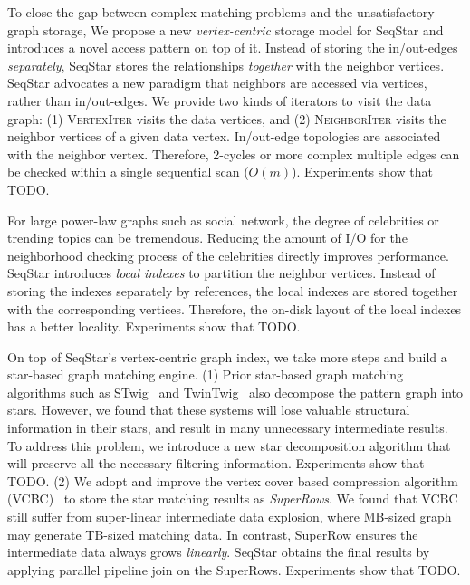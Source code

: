 To close the gap between complex matching problems and the unsatisfactory graph storage,
We propose a new \emph{vertex-centric} storage model for SeqStar and introduces a novel access pattern on top of it.
Instead of storing the in/out-edges \emph{separately}, SeqStar stores the relationships \emph{together} with the neighbor vertices.
SeqStar advocates a new paradigm that neighbors are accessed via vertices, rather than in/out-edges.
We provide two kinds of iterators to visit the data graph:
(1) \textsc{VertexIter} visits the data vertices, and (2) \textsc{NeighborIter} visits the neighbor vertices of a given data vertex.
In/out-edge topologies are associated with the neighbor vertex.
Therefore, 2-cycles or more complex multiple edges can be checked within a single sequential scan ($O(m)$).
Experiments show that TODO\@.

For large power-law graphs such as social network, the degree of celebrities or trending topics can be tremendous.
Reducing the amount of I/O for the neighborhood checking process of the celebrities directly improves performance.
SeqStar introduces \emph{local indexes} to partition the neighbor vertices.
Instead of storing the indexes separately by references, the local indexes are stored together with the corresponding vertices.
Therefore, the on-disk layout of the local indexes has a better locality.
Experiments show that TODO\@.

On top of SeqStar's vertex-centric graph index, we take more steps and build a star-based graph matching engine.
(1) Prior star-based graph matching algorithms such as STwig~\cite{DBLP:journals/pvldb/SunWWSL12} and TwinTwig~\cite{DBLP:journals/pvldb/LaiQLC15} also decompose the pattern graph into stars.
However, we found that these systems will lose valuable structural information in their stars, and result in many unnecessary intermediate results.
To address this problem, we introduce a new star decomposition algorithm that will preserve all the necessary filtering information.
Experiments show that TODO\@.
(2) We adopt and improve the vertex cover based compression algorithm (VCBC)~\cite{DBLP:journals/pvldb/QiaoZC17} to store the star matching results as \emph{SuperRows}.
We found that VCBC still suffer from super-linear intermediate data explosion, where MB-sized graph may generate TB-sized matching data.
In contrast, SuperRow ensures the intermediate data always grows \emph{linearly}.
SeqStar obtains the final results by applying parallel pipeline join on the SuperRows.
Experiments show that TODO\@.
